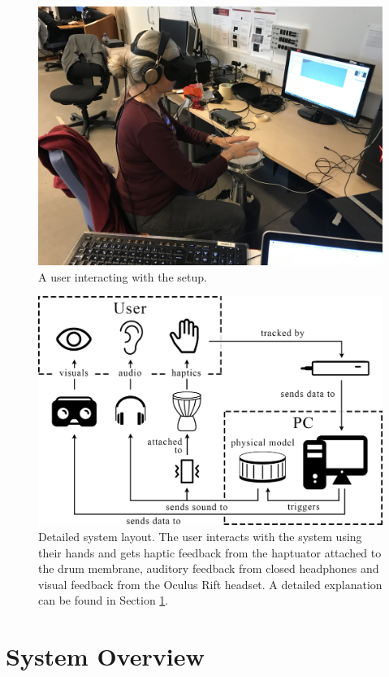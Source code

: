 \documentclass{article}
\begin{document}
\begin{figure}[t]
\includegraphics[width=1.0\columnwidth]{SMC 2020 paper template LaTeX/Images/user.jpg}
\caption{A user interacting with the setup.}
\centering
\label{fig:user}
\end{figure}
\begin{figure}[t]
\includegraphics[width=1.0\columnwidth]{Images/systemlayout-updated.png}
\caption{Detailed system layout. The user interacts with the system using their hands and gets haptic feedback from the haptuator attached to the drum membrane, auditory feedback from closed headphones and visual feedback from the Oculus Rift headset. A detailed explanation can be found in Section \ref{sec:sys}.}
\centering
\label{fig:systemLayout}
\end{figure}
\section{System Overview} \label{sec:sys}
\end{document}
